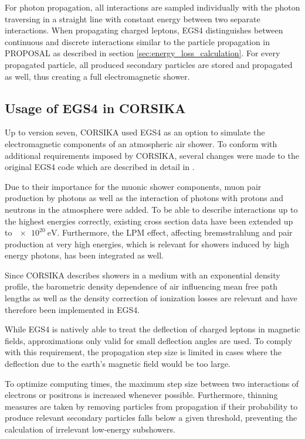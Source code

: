 For photon propagation, all interactions are sampled individually with the photon traversing in a straight line with constant energy between two separate interactions.
When propagating charged leptons, EGS4 distinguishes between continuous and discrete interactions similar to the particle propagation in PROPOSAL as described in section \ref{sec:energy_loss_calculation}.
For every propagated particle, all produced secondary particles are stored and propagated as well, thus creating a full electromagnetic shower.

\subsection{Usage of EGS4 in CORSIKA}

Up to version seven, CORSIKA used EGS4 as an option to simulate the electromagnetic components of an atmospheric air shower.
To conform with additional requirements imposed by CORSIKA, several changes were made to the original EGS4 code which are described in detail in \cite{corsika_physics}.

Due to their importance for the muonic shower components, muon pair production by photons as well as the interaction of photons with protons and neutrons in the atmosphere were added.
To be able to describe interactions up to the highest energies correctly, existing cross section data have been extended up to $\SI{e20}{\electronvolt}$.
Furthermore, the LPM effect, affecting bremsstrahlung and pair production at very high energies, which is relevant for showers induced by high energy photons, has been integrated as well.

Since CORSIKA describes showers in a medium with an exponential density profile, the barometric density dependence of air influencing mean free path lengths as well as the density correction of ionization losses are relevant and have therefore been implemented in EGS4.

While EGS4 is natively able to treat the deflection of charged leptons in magnetic fields, approximations only valid for small deflection angles are used.
To comply with this requirement, the propagation step size is limited in cases where the deflection due to the earth's magnetic field would be too large.

To optimize computing times, the maximum step size between two interactions of electrons or positrons is increased whenever possible.
Furthermore, thinning measures are taken by removing particles from propagation if their probability to produce relevant secondary particles falls below a given threshold, preventing the calculation of irrelevant low-energy subshowers.